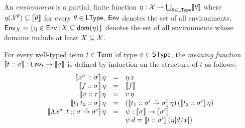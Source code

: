 \documentclass[12pt,a4paper]{report}
\newcommand{\senv}{\nstyle{env}}
\begin{document}

\begin{definition}[Environment] \label{definition:Environment}
  An {\em environment} is a partial, finite function $\eta: \mathcal{X} \rightharpoonup \bigcup_{\theta\in\mathsf{LType}} \llbracket\theta\rrbracket$
  where $\eta(\mathcal{X}^\theta) \subseteq \llbracket\theta\rrbracket$ for every $\theta \in \mathsf{LType}$. $\mathsf{Env}$ denotes
  the set of all environments, $\mathsf{Env}_X = \{\eta\in\mathsf{Env}\,|\,X \subseteq \mathsf{dom}(\eta)\}$ denotes the set of
  all environments whose domains include at least $X \subseteq \mathcal{X}$.
\end{definition}


\begin{definition}
  For every well-typed term $t \in \mathsf{Term}$ of type $\sigma \in \mathsf{SType}$, the {\em meaning function}
  $\llbracket{t}\mathrel{::}{\sigma}\rrbracket: \mathsf{Env}_t \to \llbracket\sigma\rrbracket$ is defined by induction on the structure of $t$ as
  follows:
  \[\begin{array}{rcl}
    \llbracket{x^\sigma}\mathrel{::}{\sigma}\rrbracket\,\eta
      &=& \eta\,x \\
    \llbracket{f}\mathrel{::}{\sigma}\rrbracket\,\eta 
      &=& \llbracket f\rrbracket \\
    \llbracket{v}\mathrel{::}{\tau}\rrbracket\,\eta
      &=& v\,\eta \\
    \llbracket{t_1\,t_2}\mathrel{::}{\sigma}\rrbracket\,\eta
      &=& (\llbracket{t_1}\mathrel{::}{\sigma'\stackrel{_t}{\to}\sigma}\rrbracket\,\eta)\,
          (\llbracket{t_2}\mathrel{::}{\sigma'}\rrbracket\,\eta) \\
    \llbracket{\Lambda x^\sigma.\,t}\mathrel{::}{\sigma\stackrel{_t}{\to}\sigma'}\rrbracket\,\eta
      &=& \psi: \llbracket\sigma\rrbracket \to \llbracket\sigma'\rrbracket \\
      & & \psi\, d = \llbracket{t}\mathrel{::}{\sigma'}\rrbracket\,(\eta[d/x])
  \end{array}\]
\end{definition}
\end{document}
